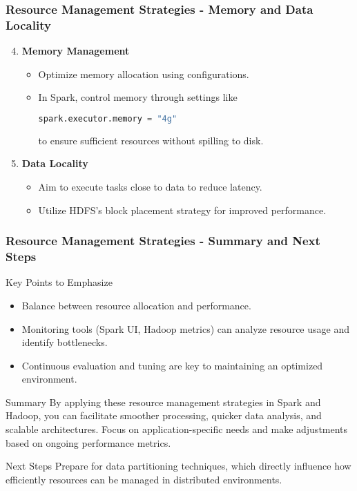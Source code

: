 \documentclass{beamer}
\begin{document}
\begin{frame}[fragile]
    \frametitle{Resource Management Strategies - Memory and Data Locality}
    \begin{enumerate}
        \setcounter{enumi}{3}
        \item \textbf{Memory Management}
        \begin{itemize}
            \item Optimize memory allocation using configurations.
            \item In Spark, control memory through settings like
            \begin{lstlisting}[language=Python]
spark.executor.memory = "4g"
            \end{lstlisting}
            to ensure sufficient resources without spilling to disk.
        \end{itemize}

        \item \textbf{Data Locality}
        \begin{itemize}
            \item Aim to execute tasks close to data to reduce latency.
            \item Utilize HDFS's block placement strategy for improved performance.
        \end{itemize}
    \end{enumerate}
\end{frame}

\begin{frame}[fragile]
    \frametitle{Resource Management Strategies - Summary and Next Steps}
    \begin{block}{Key Points to Emphasize}
        \begin{itemize}
            \item Balance between resource allocation and performance.
            \item Monitoring tools (Spark UI, Hadoop metrics) can analyze resource usage and identify bottlenecks.
            \item Continuous evaluation and tuning are key to maintaining an optimized environment.
        \end{itemize}
    \end{block}
    
    \begin{block}{Summary}
        By applying these resource management strategies in Spark and Hadoop, you can facilitate smoother processing, quicker data analysis, and scalable architectures. Focus on application-specific needs and make adjustments based on ongoing performance metrics.
    \end{block}

    \begin{block}{Next Steps}
        Prepare for data partitioning techniques, which directly influence how efficiently resources can be managed in distributed environments.
    \end{block}
\end{frame}
\end{document}
